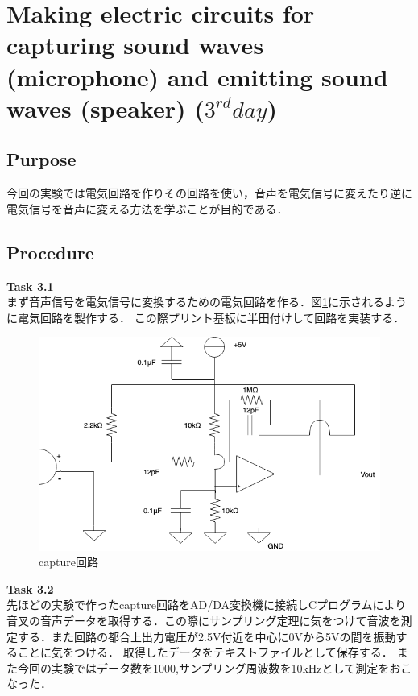 \documentclass[11pt, a4paper,twocolumn]{jarticle}
\begin{document}
\section{Making electric circuits for capturing sound waves (microphone) and emitting sound waves (speaker) ($3^{rd} day$)}
\subsection{Purpose}
今回の実験では電気回路を作りその回路を使い，音声を電気信号に変えたり逆に電気信号を音声に変える方法を学ぶことが目的である．
\subsection{Procedure}
\noindent
\textbf{Task 3.1} \\
まず音声信号を電気信号に変換するための電気回路を作る．図\ref{fig:15}に示されるように電気回路を製作する．
この際プリント基板に半田付けして回路を実装する．

\begin{figure}[htbp]
 \begin{center}
  \includegraphics[width=0.8\linewidth]{fig15.png}
 \end{center}
 \caption{capture回路}
 \label{fig:15}
\end{figure}

\noindent
\textbf{Task 3.2} \\
先ほどの実験で作ったcapture回路をAD/DA変換機に接続しCプログラムにより音叉の音声データを取得する．この際にサンプリング定理に気をつけて音波を測定する．また回路の都合上出力電圧が2.5V付近を中心に0Vから5Vの間を振動することに気をつける．
取得したデータをテキストファイルとして保存する．
また今回の実験ではデータ数を1000,サンプリング周波数を10kHzとして測定をおこなった．
\end{document}
